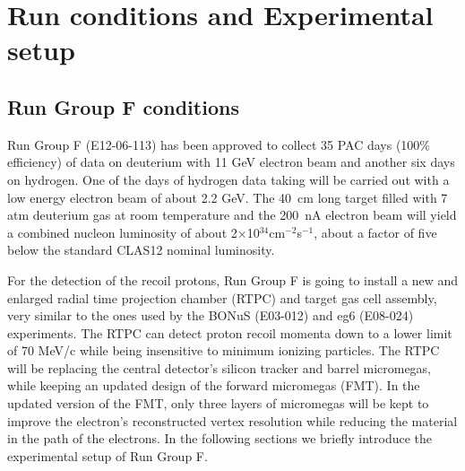 \chapter{Run conditions and Experimental setup}
\label{chap:physics}

\section{Run Group F conditions}

Run Group F (E12-06-113) has been approved to collect 35 PAC days (100\% 
efficiency) of data on deuterium with 11 GeV electron beam and another six days 
on hydrogen. One of the days of hydrogen data taking will be carried out with a 
low energy electron beam of about 2.2 GeV. The 40~cm long target filled with 7 
atm deuterium gas at room temperature and the 200~nA electron beam will yield a 
combined nucleon luminosity of about 2$\times$10$^{34}$cm$^{-2}$s$^{-1}$, about 
a factor of five below the standard CLAS12 nominal luminosity.

For the detection of the recoil protons, Run Group F is going to install a new 
and enlarged radial time projection chamber (RTPC) and target gas cell 
assembly, very similar to the ones used by the BONuS (E03-012) and eg6 
(E08-024) experiments. The RTPC can detect proton recoil momenta down to a 
lower limit of 70 MeV/c while being insensitive to minimum ionizing particles.  
The RTPC will be replacing the central detector's silicon tracker
and barrel micromegas, while keeping an updated design of the forward 
micromegas (FMT). In the updated version of the FMT, only three layers of 
micromegas will be kept to improve the electron's reconstructed vertex 
resolution while reducing the material in the path of the electrons. In the 
following sections we briefly introduce the experimental setup of Run Group F. 


